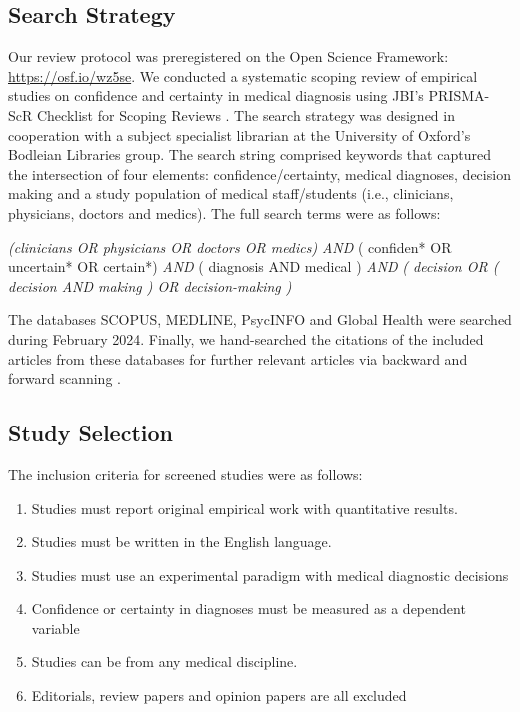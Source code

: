 \documentclass[a4paper, nobind]{templates/ociamthesis}
\providecommand{\tightlist}{%
  \setlength{\itemsep}{0pt}\setlength{\parskip}{0pt}}
\begin{document}
\subsection*{Search Strategy}\label{search-strategy}

Our review protocol was preregistered on the Open Science Framework: \url{https://osf.io/wz5se}. We conducted a systematic scoping review of empirical studies on confidence and certainty in medical diagnosis using JBI's PRISMA-ScR Checklist for Scoping Reviews \autocite{peters_scoping_2024}. The search strategy was designed in cooperation with a subject specialist librarian at the University of Oxford's Bodleian Libraries group. The search string comprised keywords that captured the intersection of four elements: confidence/certainty, medical diagnoses, decision making and a study population of medical staff/students (i.e., clinicians, physicians, doctors and medics). The full search terms were as follows:

\hfill\break
\emph{(clinicians OR physicians OR doctors OR medics)} \emph{AND} ( confiden* OR uncertain* OR certain*) \emph{AND} ( diagnosis AND medical ) \emph{AND} \emph{( decision OR ( decision AND making ) OR decision-making )}

\hfill\break
The databases SCOPUS, MEDLINE, PsycINFO and Global Health were searched during February 2024. Finally, we hand-searched the citations of the included articles from these databases for further relevant articles via backward and forward scanning \autocite{webster_analyzing_2002,tranfield_towards_2003}.

\subsection*{Study Selection}\label{study-selection}

The inclusion criteria for screened studies were as follows:

\begin{enumerate}
\def\labelenumi{\arabic{enumi}.}
\tightlist
\item
  Studies must report original empirical work with quantitative results.
\item
  Studies must be written in the English language.
\item
  Studies must use an experimental paradigm with medical diagnostic decisions
\item
  Confidence or certainty in diagnoses must be measured as a dependent variable
\item
  Studies can be from any medical discipline.
\item
  Editorials, review papers and opinion papers are all excluded
\end{enumerate}
\end{document}

